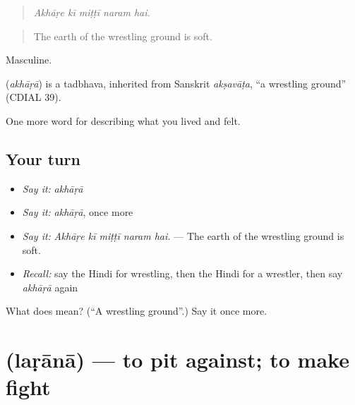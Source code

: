 \begin{quote}
    
\end{quote}

\begin{quote}
\emph{Akhāṛe kī miṭṭī naram hai.}
\end{quote}

\begin{quote}
The earth of the wrestling ground is soft.
\end{quote}

Masculine.

\begin{cousinweb}
\textbf{} (\emph{akhāṛā}) is a tadbhava, inherited from Sanskrit \emph{akṣavāṭa}, \textquotedblleft{}a wrestling ground\textquotedblright{} (CDIAL 39).
\end{cousinweb}

\begin{grammarlens}[title={What you've built}]
One more word for describing what you lived and felt.
\end{grammarlens}

\subsection*{Your turn}
\begin{itemize}
\raggedright
  \item \emph{Say it:} \emph{akhāṛā}
  \item \emph{Say it:} \emph{akhāṛā}, once more
  \item \emph{Say it:} \emph{Akhāṛe kī miṭṭī naram hai.} — The earth of the wrestling ground is soft.
  \item \emph{Recall:} say the Hindi for wrestling, then the Hindi for a wrestler, then say \emph{akhāṛā} again
\end{itemize}

\begin{tcolorbox}[breakable,colback=teal!4,colframe=teal!35!black,title={Before you move on}]
What does  mean? (\textquotedblleft{}A wrestling ground\textquotedblright{}.) Say it once more.
\end{tcolorbox}
\section[\texorpdfstring{\hi{लड़ाना} (laṛānā)}{लड़ाना (laṛānā)}]{ (laṛānā) — to pit against; to make fight}

